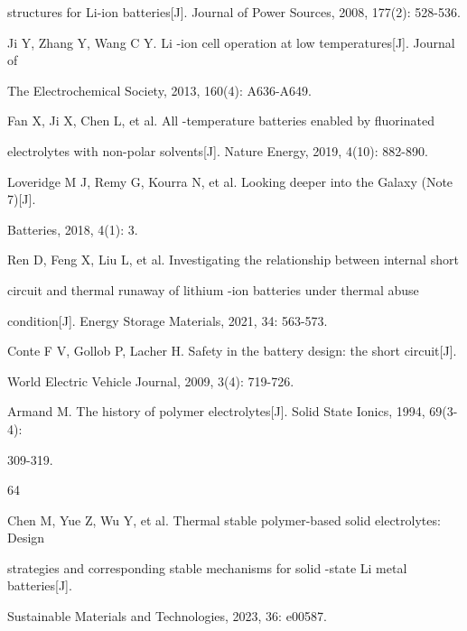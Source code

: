 structures for Li-ion batteries[J]. Journal of Power Sources, 2008, 177(2): 528-536.\par
[11] Ji Y, Zhang Y, Wang C Y. Li -ion cell operation at low temperatures[J]. Journal of\par
The Electrochemical Society, 2013, 160(4): A636-A649.\par
[12] Fan X, Ji X, Chen L, et al. All -temperature batteries enabled by fluorinated\par
electrolytes with non-polar solvents[J]. Nature Energy, 2019, 4(10): 882-890.\par
[13] Loveridge M J, Remy G, Kourra N, et al. Looking deeper into the Galaxy (Note 7)[J].\par
Batteries, 2018, 4(1): 3.\par
[14] Ren D, Feng X, Liu L, et al. Investigating the relationship between internal short\par
circuit and thermal runaway of lithium -ion batteries under thermal abuse\par
condition[J]. Energy Storage Materials, 2021, 34: 563-573.\par
[15] Conte F V, Gollob P, Lacher H. Safety in the battery design: the short circuit[J].\par
World Electric Vehicle Journal, 2009, 3(4): 719-726.\par
[16] Armand M. The history of polymer electrolytes[J]. Solid State Ionics, 1994, 69(3-4):\par
309-319.\par

64\par
[17] Chen M, Yue Z, Wu Y, et al. Thermal stable polymer-based solid electrolytes: Design\par
strategies and corresponding stable mechanisms for solid -state Li metal batteries[J].\par
Sustainable Materials and Technologies, 2023, 36: e00587.\par

